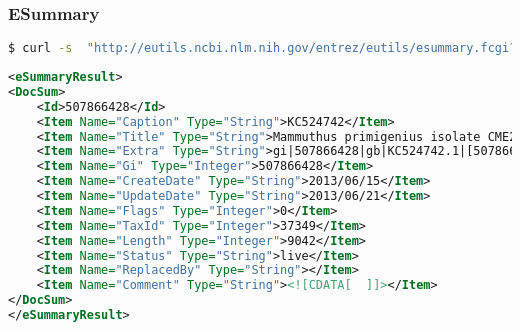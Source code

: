 \documentclass{beamer}
\begin{document}
\begin{frame}[fragile]
\frametitle{ESummary}
\begin{lstlisting}[language=bash,basicstyle=\tiny,breaklines=true]
$ curl -s  "http://eutils.ncbi.nlm.nih.gov/entrez/eutils/esummary.fcgi?db=nucleotide&id=507866428"
\end{lstlisting}

\begin{lstlisting}[language=xml,basicstyle=\tiny,breaklines=false]
<eSummaryResult>
<DocSum>
	<Id>507866428</Id>
	<Item Name="Caption" Type="String">KC524742</Item>
	<Item Name="Title" Type="String">Mammuthus primigenius isolate CME2005/915 myoglobin (Mb) gene, partial cds</Item>
	<Item Name="Extra" Type="String">gi|507866428|gb|KC524742.1|[507866428]</Item>
	<Item Name="Gi" Type="Integer">507866428</Item>
	<Item Name="CreateDate" Type="String">2013/06/15</Item>
	<Item Name="UpdateDate" Type="String">2013/06/21</Item>
	<Item Name="Flags" Type="Integer">0</Item>
	<Item Name="TaxId" Type="Integer">37349</Item>
	<Item Name="Length" Type="Integer">9042</Item>
	<Item Name="Status" Type="String">live</Item>
	<Item Name="ReplacedBy" Type="String"></Item>
	<Item Name="Comment" Type="String"><![CDATA[  ]]></Item>
</DocSum>
</eSummaryResult>
\end{lstlisting}
\end{frame}
\end{document}
